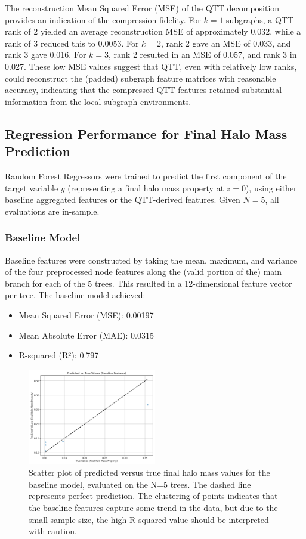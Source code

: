 \documentclass[twocolumn]{aastex631}
\begin{document}
The reconstruction Mean Squared Error (MSE) of the QTT decomposition provides an indication of the compression fidelity. For $k=1$ subgraphs, a QTT rank of 2 yielded an average reconstruction MSE of approximately 0.032, while a rank of 3 reduced this to 0.0053. For $k=2$, rank 2 gave an MSE of 0.033, and rank 3 gave 0.016. For $k=3$, rank 2 resulted in an MSE of 0.057, and rank 3 in 0.027. These low MSE values suggest that QTT, even with relatively low ranks, could reconstruct the (padded) subgraph feature matrices with reasonable accuracy, indicating that the compressed QTT features retained substantial information from the local subgraph environments.

\subsection{Regression Performance for Final Halo Mass Prediction}

Random Forest Regressors were trained to predict the first component of the target variable $y$ (representing a final halo mass property at $z=0$), using either baseline aggregated features or the QTT-derived features. Given $N=5$, all evaluations are in-sample.

\subsubsection{Baseline Model}
Baseline features were constructed by taking the mean, maximum, and variance of the four preprocessed node features along the (valid portion of the) main branch for each of the 5 trees. This resulted in a 12-dimensional feature vector per tree.
The baseline model achieved:
\begin{itemize}
    \item Mean Squared Error (MSE): 0.00197
    \item Mean Absolute Error (MAE): 0.0315
    \item R-squared (R²): 0.797
\end{itemize}

\begin{figure}[h!]
    \centering
    \includegraphics[width=0.5\textwidth]{../input_files/plots/pred_vs_true_baseline_1_20250524-175150.png}
    \caption{Scatter plot of predicted versus true final halo mass values for the baseline model, evaluated on the N=5 trees. The dashed line represents perfect prediction. The clustering of points indicates that the baseline features capture some trend in the data, but due to the small sample size, the high R-squared value should be interpreted with caution.
}
    \label{fig:pred_vs_true_baseline}
\end{figure}
\end{document}
